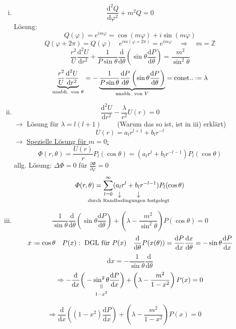 \documentclass[titlepage,11pt,a4paper,ngerman]{report}
\newcommand*{\defeq}{\mathrel{\vcenter{\baselineskip0.5ex \lineskiplimit0pt \hbox{\scriptsize.}\hbox{\scriptsize.}}}=}
\newcommand{\tx}[1]{\textrm{#1}}
\newcommand{\const}{\tx{const.}}
\newcommand{\ub}[1]{\underbrace{#1}}
\newcommand{\dd}{\tx{d}}
\newcommand{\verteq}{\rotatebox{90}{$\,=$}}
\newcommand{\equalto}[2]{\underset{\scriptstyle\overset{\mkern4mu\verteq}{#2}}{#1}}
\newcommand{\custo}[3]{\underset{\scriptstyle\overset{\mkern4mu\rotatebox{-90}{$\,#1$}}{#3}}{#2}}
\newcommand{\prt}[2]{\frac{\partial #1}{\partial #2}}
\newcommand{\prd}[2]{\frac{\tx{d} #1}{\tx{d} #2}}
\renewcommand{\Phi}{\varPhi}
\newcommand{\summ}[2]{\sum_{#1}^{#2}}
\newcommand{\frbox}[2]{\begin{tcolorbox}[colback=white,colframe=red!75!black,fonttitle=\bfseries,title=#1]#2\end{tcolorbox}}
\begin{document}
\begin{enumerate}[i)]
	\item $$\frac{\textrm{d}^2 Q}{\textrm{d} \varphi^2} + m^2 Q = 0$$ Lösung: $$Q(\varphi) = e^{im\varphi} = \cos(m\varphi) + i\sin(m\varphi)$$
	 	$$Q(\varphi + 2 \pi) = Q(\varphi) \quad e^{im(\varphi + 2\pi)} = e^{im\varphi} \quad \Rightarrow \quad m = \mathbb Z$$
	 	$$\frac{r^2}{U} \frac{\textrm{d}^2 U}{\textrm{d} r^2} + \frac{1}{P\sin\theta} \frac{\textrm{d}}{\textrm{d} \theta}\left( \sin\theta \frac{\textrm{d}P}{\textrm{d}\theta} \right) = \frac{m^2}{\sin^2\theta}$$
	 	$$\ub{\frac{r^2}{U} \frac{\textrm{d}^2 U}{\textrm{d} r^2}}_{\tx{unabh. von } \theta } = - \ub{\frac{1}{P\sin\theta}\frac{\textrm{d} P}{\textrm{d} \theta}\left( \sin\theta \frac{\textrm{d}P}{\textrm{d}\theta} \right)}_{\tx{unabh. von } V} = \const. \defeq \lambda$$
	 \item $$\frac{\textrm{d}^2 U}{\textrm{d} r^2} - \frac{\lambda}{r^2} U(r) = 0$$
	 	$\rightarrow$ Lösung für $\lambda = l(l + 1) \qquad$ (Warum das so ist, ist  in iii) erklärt)
	 	$$U(r) = a_l r^{l + 1} + b_l r^{-l}$$
	 	$\rightarrow$ \underline{Spezielle Lösung für $m = 0$:}
	 	$$\Phi(r,\theta) = \frac{U(r)}{r}P_l (\cos\theta) = (a_l r^l + b_l r^{-l - 1}) P_l (\cos\theta)$$
	 	allg. Lösung: $\Delta\Phi = 0$ für $\prt{\Phi}{\varphi} = 0$
	 	$$\Phi(r,\theta) = \summ{l = 0}{\infty} (\custo{\to}{a_l}{\mathclap{\hspace{30pt}\textrm{durch Randbedingungen festgelegt}}} r^l + \custo{\to}{b_l}{} r^{-l - 1}) P_l(\cos\theta)$$
	 \item $$\frac{1}{\sin\theta} \frac{\textrm{d}}{\textrm{d} \theta}\left( \sin\theta \frac{\textrm{d}P}{\textrm{d}\theta}\right) + \left(\lambda - \frac{m^2}{\sin^2\theta}\right)P(\cos\theta) = 0$$
	 	$$x \defeq \cos\theta \quad P(x): \textrm{ DGL für } P(x) \quad \frac{\textrm{d}}{\textrm{d} \theta} P(x(\theta)) = \frac{\textrm{d}P}{\textrm{d}x} \frac{\textrm{d}x}{\textrm{d}\theta} = -\sin \theta \frac{\textrm{d}P}{\textrm{d}x}$$
	 	\begin{equation*}
	 	\dd x = - \frac{1}{\sin\theta} \prd{}{\theta}
	 	\end{equation*}
	 	$$\Rightarrow - \frac{\textrm{d}}{\textrm{d}x} \bigg( - \equalto{\sin^2\theta}{1 - x^2} \frac{\textrm{d}P}{\textrm{d}x} \bigg) + \left(\lambda - \frac{m^2}{1-x^2}\right) P(x) = 0$$
\end{enumerate}
\frbox{Zugeordnete Legendresche DGL}{$$\Rightarrow \frac{\textrm{d}}{\textrm{d}x} \left( (1-x^2) \frac{\textrm{d}P}{\textrm{d}x} \right) + \left( \lambda - \frac{m^2}{1 - x^2} \right) P(x) = 0$$}
\end{document}
